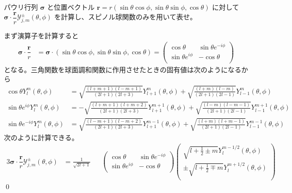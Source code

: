 \documentclass[uplatex,dvipdfmx,a4paper,11pt]{jlreq}
\makeatletter
\newcommand{\rr}{\bm{r}}
\numberwithin{equation}{section}
\theoremstyle{definition}
\renewenvironment{proof}[1][\proofname]{\par
  \normalfont
  \topsep6\p@\@plus6\p@ \trivlist
  \item[\hskip\labelsep{\bfseries #1}\@addpunct{\bfseries}]\ignorespaces\quad\par
}{%
  \qed\endtrivlist\@endpefalse
}
\renewcommand\proofname{証明}
\makeatother
\begin{document}
\begin{problem}
パウリ行列 $\bm{\sigma}$ と位置ベクトル $\rr = r(\sin\theta\cos\phi, \sin\theta\sin\phi, \cos\theta)$ に対して $\bm{\sigma}\cdot\dfrac{\rr}{r}\mathcal{Y}_{j, m}^\pm(\theta, \phi)$ を計算し、スピノル球関数のみを用いて表せ。
\end{problem}
\begin{proof}
  まず演算子を計算すると
  \begin{align}
    \bm{\sigma}\cdot\dfrac{\rr}{r} & = \bm{\sigma}\cdot (\sin\theta\cos\phi, \sin\theta\sin\phi, \cos\theta) =
    \begin{pmatrix}
      \cos\theta           & \sin\theta e^{-i\phi} \\
      \sin\theta e^{i\phi} & -\cos\theta           \\
    \end{pmatrix}
  \end{align}
  となる。三角関数を球面調和関数に作用させたときの固有値は次のようになるから
  \begin{align}
    \cos\theta Y_{l}^m(\theta, \phi)            & = \sqrt{\frac{(l + m + 1)(l - m + 1)}{(2l + 1)(2l + 3)}}Y_{l+1}^m(\theta, \phi) + \sqrt{\frac{(l + m)(l - m)}{(2l + 1)(2l - 1)}}Y_{l-1}^m(\theta, \phi)              \\
    \sin\theta e^{i\phi} Y_{l}^m(\theta, \phi)  & = -\sqrt{\frac{(l + m + 1)(l + m + 2)}{(2l + 1)(2l + 3)}}Y_{l+1}^{m+1}(\theta, \phi) + \sqrt{\frac{(l - m)(l - m - 1)}{(2l + 1)(2l - 1)}}Y_{l-1}^{m+1}(\theta, \phi) \\
    \sin\theta e^{-i\phi} Y_{l}^m(\theta, \phi) & = \sqrt{\frac{(l - m + 1)(l - m + 2)}{(2l + 1)(2l + 3)}}Y_{l+1}^{m-1}(\theta, \phi) + \sqrt{\frac{(l + m)(l + m - 1)}{(2l + 1)(2l - 1)}}Y_{l-1}^{m-1}(\theta, \phi)
  \end{align}
  次のように計算できる。
  \begin{alignat}{3}
    \bm{\sigma}\cdot\dfrac{\rr}{r}\mathcal{Y}_{j, m}^\pm(\theta, \phi) & = \frac{1}{\sqrt{2l + 1}}       &  &
    \begin{pmatrix}
      \cos\theta           & \sin\theta e^{-i\phi} \\
      \sin\theta e^{i\phi} & -\cos\theta           \\
    \end{pmatrix}
    \begin{pmatrix}
      \sqrt{l + \frac{1}{2} \pm m}Y_l^{m - 1/2}(\theta, \phi)    \\
      \pm\sqrt{l + \frac{1}{2} \mp m}Y_l^{m + 1/2}(\theta, \phi) \\

\end{pmatrix}
\end{alignat}
\end{proof}
\end{document}
